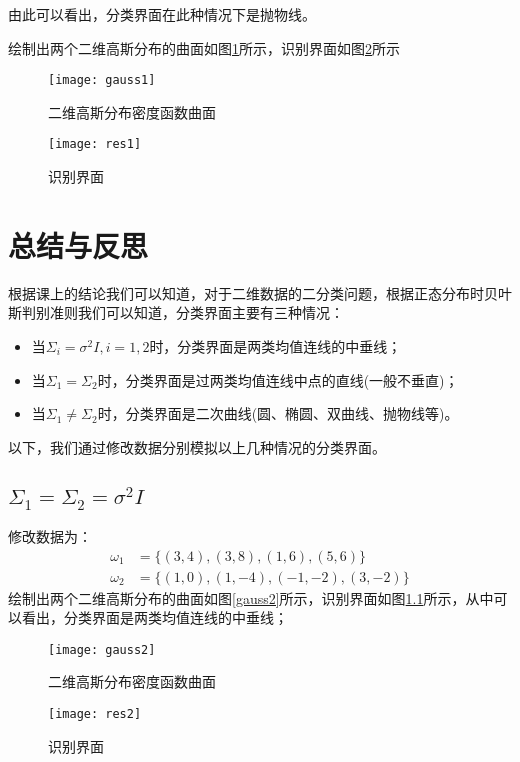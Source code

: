 \documentclass[cn]{elegantbook}
\begin{document}
由此可以看出，分类界面在此种情况下是抛物线。

绘制出两个二维高斯分布的曲面如图\ref{gauss1}所示，识别界面如图\ref{res1}所示
\begin{figure}[!h]
	\centering
	\texttt{[image: gauss1]}
	\caption{\label{gauss1}二维高斯分布密度函数曲面}
\end{figure}
\begin{figure}[!h]
	\centering
	\texttt{[image: res1]}
	\caption{\label{res1}识别界面}
\end{figure}

\chapter{总结与反思}
根据课上的结论我们可以知道，对于二维数据的二分类问题，根据正态分布时贝叶斯判别准则我们可以知道，分类界面主要有三种情况：
\begin{itemize}
	\item 当$\Sigma_i=\sigma^2I,i=1,2$时，分类界面是两类均值连线的中垂线；
	\item 当$\Sigma_1=\Sigma_2$时，分类界面是过两类均值连线中点的直线(一般不垂直)；
	\item 当$\Sigma_1\ne\Sigma_2$时，分类界面是二次曲线(圆、椭圆、双曲线、抛物线等)。
\end{itemize}

以下，我们通过修改数据分别模拟以上几种情况的分类界面。
\section{$\Sigma_1=\Sigma_2=\sigma^2I$}
修改数据为：
\begin{equation}
\begin{aligned}
\omega_1&=\{(3,4),(3,8),(1,6),(5,6)\} \\
\omega_2&=\{(1,0),(1,-4),(-1,-2),(3,-2)\}
\end{aligned}
\end{equation}
绘制出两个二维高斯分布的曲面如图\ref{gauss2}所示，识别界面如图\ref{res2}所示，从中可以看出，分类界面是两类均值连线的中垂线；
\begin{figure}[!h]
	\centering
	\begin{minipage}{0.48\linewidth}
		\centering
		\texttt{[image: gauss2]}
		\caption{\label{gauss2}二维高斯分布密度函数曲面}
	\end{minipage}
	\begin{minipage}{0.48\linewidth}
		\centering
		\texttt{[image: res2]}
		\caption{\label{res2}识别界面}
	\end{minipage}
\end{figure}
\end{document}
